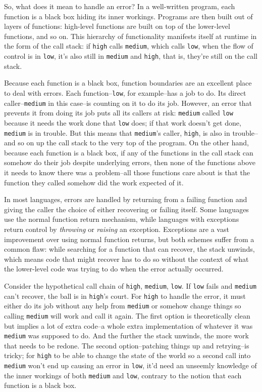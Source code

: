 So, what does it mean to handle an error? In a well-written program,
each function is a black box hiding its inner workings. Programs are
then built out of layers of functions: high-level functions are built on
top of the lower-level functions, and so on. This hierarchy of
functionality manifests itself at runtime in the form of the call stack:
if \texttt{high} calls \texttt{medium}, which calls \texttt{low}, when
the flow of control is in \texttt{low}, it's also still in
\texttt{medium} and \texttt{high}, that is, they're still on the call
stack.

Because each function is a black box, function boundaries are an
excellent place to deal with errors. Each function--\texttt{low}, for
example--has a job to do. Its direct caller--\texttt{medium} in this
case--is counting on it to do its job. However, an error that prevents
it from doing its job puts all its callers at risk: \texttt{medium}
called \texttt{low} because it needs the work done that \texttt{low}
does; if that work doesn't get done, \texttt{medium} is in trouble. But
this means that \texttt{medium}'s caller, \texttt{high}, is also in
trouble--and so on up the call stack to the very top of the program. On
the other hand, because each function is a black box, if any of the
functions in the call stack can somehow do their job despite underlying
errors, then none of the functions above it needs to know there was a
problem--all those functions care about is that the function they called
somehow did the work expected of it.

In most languages, errors are handled by returning from a failing
function and giving the caller the choice of either recovering or
failing itself. Some languages use the normal function return mechanism,
while languages with exceptions return control by \emph{throwing} or
\emph{raising} an exception. Exceptions are a vast improvement over
using normal function returns, but both schemes suffer from a common
flaw: while searching for a function that can recover, the stack
unwinds, which means code that might recover has to do so without the
context of what the lower-level code was trying to do when the error
actually occurred.

Consider the hypothetical call chain of \texttt{high}, \texttt{medium},
\texttt{low}. If \texttt{low} fails and \texttt{medium} can't recover,
the ball is in \texttt{high}'s court. For \texttt{high} to handle the
error, it must either do its job without any help from \texttt{medium}
or somehow change things so calling \texttt{medium} will work and call
it again. The first option is theoretically clean but implies a lot of
extra code--a whole extra implementation of whatever it was
\texttt{medium} was supposed to do. And the further the stack unwinds,
the more work that needs to be redone. The second option--patching
things up and retrying--is tricky; for \texttt{high} to be able to
change the state of the world so a second call into \texttt{medium}
won't end up causing an error in \texttt{low}, it'd need an unseemly
knowledge of the inner workings of both \texttt{medium} and
\texttt{low}, contrary to the notion that each function is a black box.

